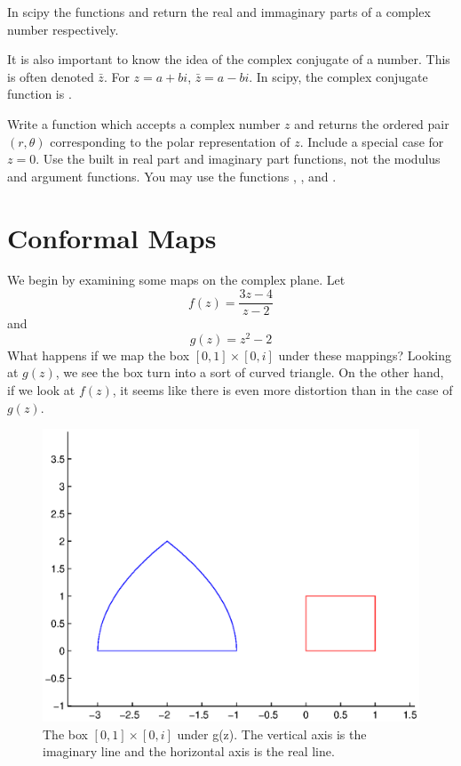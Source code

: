 In scipy the functions  and  return the real and immaginary parts of a complex number respectively. 

It is also important to know the idea of the complex conjugate of a number. This is often denoted $\bar{z}$. For $z=a+bi$, $\bar{z}=a-bi$. In scipy, the complex conjugate function is . 

\begin{problem}
Write a function which accepts a complex number $z$ and returns the ordered pair $(r,\theta)$ corresponding to the polar representation of $z$. Include a special case for $z=0$. Use the built in real part and imaginary part functions, not the modulus and argument functions. You may use the functions , , and  .
\end{problem}

\section*{Conformal Maps}

We begin by examining some maps on the complex plane.  Let
\[
f(z) = \frac{3z - 4}{z - 2}
\]
and
\[
g(z) = z^2 - 2
\]
What happens if we map the box $[0,1]\times[0,i]$ under these mappings?  
\newpage
Looking at $g(z)$, we see the box turn into a sort of curved triangle.  On the other hand, if we look at $f(z)$, it seems like there is even more distortion than in the case of $g(z)$.
\begin{figure}
\begin{center}
\includegraphics[scale=0.5]{map1}
\caption{The box $[0,1]\times[0,i]$ under g(z).  The vertical axis is the imaginary line and the horizontal axis is the real line.}
\end{center}
\end{figure}

